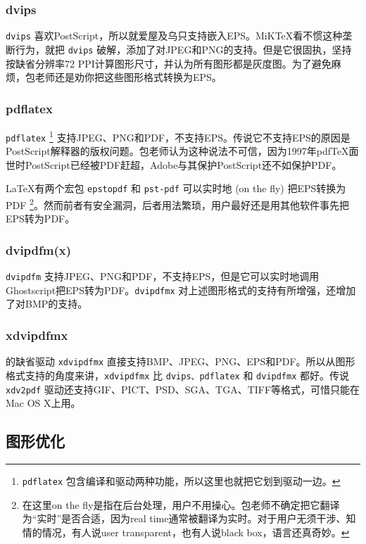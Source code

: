 \subsubsection{dvips}

\texttt{dvips} 喜欢PostScript，所以就爱屋及乌只支持嵌入EPS。MiKTeX看不惯这种垄断行为，就把 \texttt{dvips} 破解，添加了对JPEG和PNG的支持。但是它很固执，坚持按缺省分辨率72 PPI计算图形尺寸，并认为所有图形都是灰度图。为了避免麻烦，包老师还是劝你把这些图形格式转换为EPS。

\subsubsection{pdflatex}
\texttt{pdflatex} \footnote{\texttt{pdflatex} 包含编译和驱动两种功能，所以这里也就把它划到驱动一边。} 支持JPEG、PNG和PDF，不支持EPS。传说它不支持EPS的原因是PostScript解释器的版权问题。包老师认为这种说法不可信，因为1997年pdfTeX面世时PostScript已经被PDF赶超，Adobe与其保护PostScript还不如保护PDF。

\LaTeX 有两个宏包 \texttt{epstopdf} 和 \texttt{pst-pdf} 可以实时地 (on the fly) 把EPS转换为PDF \footnote{在这里on the fly是指在后台处理，用户不用操心。包老师不确定把它翻译为“实时”是否合适，因为real time通常被翻译为实时。对于用户无须干涉、知情的情况，有人说user transparent，也有人说black box，语言还真奇妙。}。然而前者有安全漏洞，后者用法繁琐，用户最好还是用其他软件事先把EPS转为PDF。

\subsubsection{dvipdfm(x)}

\texttt{dvipdfm} 支持JPEG、PNG和PDF，不支持EPS，但是它可以实时地调用Ghostscript把EPS转为PDF。\texttt{dvipdfmx} 对上述图形格式的支持有所增强，还增加了对BMP的支持。

\subsubsection{xdvipdfmx}

\XeLaTeX 的缺省驱动 \texttt{xdvipdfmx} 直接支持BMP、JPEG、PNG、EPS和PDF。所以从图形格式支持的角度来讲，\texttt{xdvipdfmx} 比 \texttt{dvips、pdflatex} 和 \texttt{dvipdfmx} 都好。传说 \texttt{xdv2pdf} 驱动还支持GIF、PICT、PSD、SGA、TGA、TIFF等格式，可惜只能在Mac OS X上用。

\subsection{图形优化}

